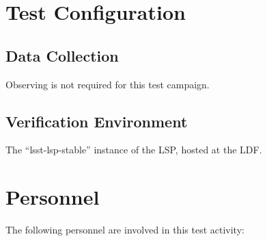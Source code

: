\documentclass[DM,lsstdraft,STR,toc]{lsstdoc}
\begin{document}
\section{Test Configuration}
\label{sect:configuration}

\subsection{Data Collection}

  Observing is not required for this test campaign.

\subsection{Verification Environment}
\label{sect:hwconf}
  The ``lsst-lsp-stable'' instance of the LSP, hosted at the LDF.





\newpage
\section{Personnel}
\label{sect:personnel}

The following personnel are involved in this test activity:
\end{document}
